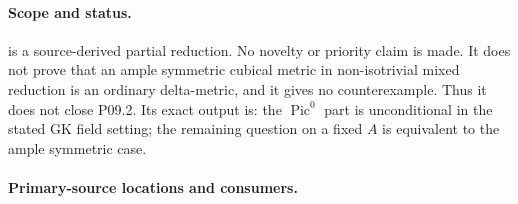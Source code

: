 
\paragraph{Scope and status.}
 is a source-derived partial reduction.  No
novelty or priority claim is made.  It does not prove that an ample symmetric
cubical metric in non-isotrivial mixed reduction is an ordinary
delta-metric, and it gives no counterexample.  Thus it does not close P09.2.
Its exact output is: the \(\operatorname{Pic}^0\) part is unconditional in
the stated GK field setting; the remaining question on a fixed \(A\) is
equivalent to the ample symmetric case.

\paragraph{Primary-source locations and consumers.}
